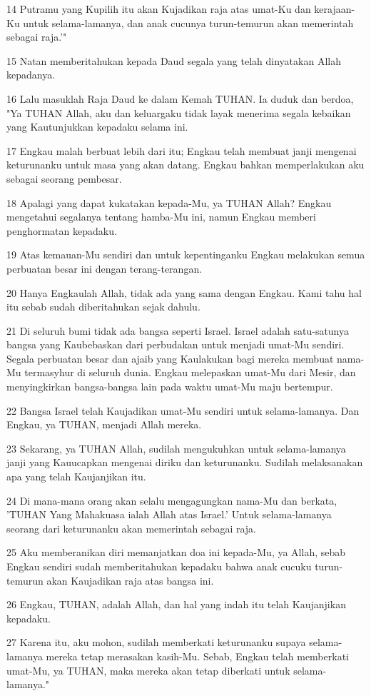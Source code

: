 \par 14 Putramu yang Kupilih itu akan Kujadikan raja atas umat-Ku dan kerajaan-Ku untuk selama-lamanya, dan anak cucunya turun-temurun akan memerintah sebagai raja.'"
\par 15 Natan memberitahukan kepada Daud segala yang telah dinyatakan Allah kepadanya.
\par 16 Lalu masuklah Raja Daud ke dalam Kemah TUHAN. Ia duduk dan berdoa, "Ya TUHAN Allah, aku dan keluargaku tidak layak menerima segala kebaikan yang Kautunjukkan kepadaku selama ini.
\par 17 Engkau malah berbuat lebih dari itu; Engkau telah membuat janji mengenai keturunanku untuk masa yang akan datang. Engkau bahkan memperlakukan aku sebagai seorang pembesar.
\par 18 Apalagi yang dapat kukatakan kepada-Mu, ya TUHAN Allah? Engkau mengetahui segalanya tentang hamba-Mu ini, namun Engkau memberi penghormatan kepadaku.
\par 19 Atas kemauan-Mu sendiri dan untuk kepentinganku Engkau melakukan semua perbuatan besar ini dengan terang-terangan.
\par 20 Hanya Engkaulah Allah, tidak ada yang sama dengan Engkau. Kami tahu hal itu sebab sudah diberitahukan sejak dahulu.
\par 21 Di seluruh bumi tidak ada bangsa seperti Israel. Israel adalah satu-satunya bangsa yang Kaubebaskan dari perbudakan untuk menjadi umat-Mu sendiri. Segala perbuatan besar dan ajaib yang Kaulakukan bagi mereka membuat nama-Mu termasyhur di seluruh dunia. Engkau melepaskan umat-Mu dari Mesir, dan menyingkirkan bangsa-bangsa lain pada waktu umat-Mu maju bertempur.
\par 22 Bangsa Israel telah Kaujadikan umat-Mu sendiri untuk selama-lamanya. Dan Engkau, ya TUHAN, menjadi Allah mereka.
\par 23 Sekarang, ya TUHAN Allah, sudilah mengukuhkan untuk selama-lamanya janji yang Kauucapkan mengenai diriku dan keturunanku. Sudilah melaksanakan apa yang telah Kaujanjikan itu.
\par 24 Di mana-mana orang akan selalu mengagungkan nama-Mu dan berkata, 'TUHAN Yang Mahakuasa ialah Allah atas Israel.' Untuk selama-lamanya seorang dari keturunanku akan memerintah sebagai raja.
\par 25 Aku memberanikan diri memanjatkan doa ini kepada-Mu, ya Allah, sebab Engkau sendiri sudah memberitahukan kepadaku bahwa anak cucuku turun-temurun akan Kaujadikan raja atas bangsa ini.
\par 26 Engkau, TUHAN, adalah Allah, dan hal yang indah itu telah Kaujanjikan kepadaku.
\par 27 Karena itu, aku mohon, sudilah memberkati keturunanku supaya selama-lamanya mereka tetap merasakan kasih-Mu. Sebab, Engkau telah memberkati umat-Mu, ya TUHAN, maka mereka akan tetap diberkati untuk selama-lamanya."

